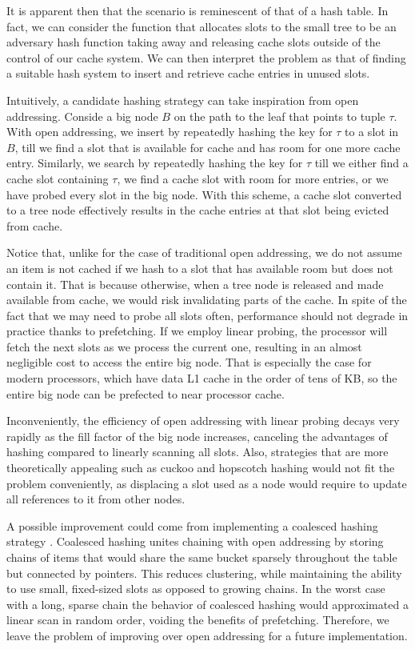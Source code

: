 \documentclass{article}
\begin{document}
It is apparent then that the scenario is reminescent of that of a hash table.
In fact, we can consider the function that allocates slots to the small tree to be an adversary
hash function taking away and releasing cache slots outside of the control of our cache system.
We can then interpret the problem as that of finding a suitable hash system to insert and retrieve
cache entries in unused slots.

Intuitively, a candidate hashing strategy can take inspiration from open addressing.
Conside a big node $B$ on the path to the leaf that points to tuple $\tau$.
With open addressing, we insert by repeatedly hashing the key for $\tau$ to a slot in $B$,
till we find a slot that is available for cache and has room for one more cache entry.
Similarly, we search by repeatedly hashing the key for $\tau$ till we either find
a cache slot containing $\tau$, we find a cache slot with room for more entries,
or we have probed every slot in the big node.
With this scheme, a cache slot converted to a tree node effectively results
in the cache entries at that slot being evicted from cache.

Notice that, unlike for the case of traditional open addressing, we do not assume an item is not cached
if we hash to a slot that has available room but does not contain it.
That is because otherwise, when a tree node is released and made available from cache, we would risk
invalidating parts of the cache.
In spite of the fact that we may need to probe all slots often, performance should not degrade in practice
thanks to prefetching.
If we employ linear probing, the processor will fetch the next slots as we process the current one,
resulting in an almost negligible cost to access the entire big node.
That is especially the case for modern processors, which have data L1 cache in the order of tens of KB,
so the entire big node can be prefected to near processor cache.

Inconveniently, the efficiency of open addressing with linear probing decays very rapidly as the fill factor
of the big node increases, canceling the advantages of hashing compared to linearly scanning all slots.
Also, strategies that are more theoretically appealing such as cuckoo and hopscotch hashing
would not fit the problem conveniently, as displacing a slot used as a node would require to update all references
to it from other nodes.

A possible improvement could come from implementing a coalesced hashing strategy \citep{Vitter:1987}.
Coalesced hashing unites chaining with open addressing by storing chains of items that would
share the same bucket sparsely throughout the table but connected by pointers.
This reduces clustering, while maintaining the ability to use small, fixed-sized slots as opposed to growing chains.
In the worst case with a long, sparse chain the behavior of coalesced hashing would approximated a linear
scan in random order, voiding the benefits of prefetching.
Therefore, we leave the problem of improving over open addressing for a future implementation.
\end{document}
